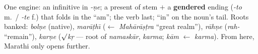 One engine: an infinitive in \emph{-\d{n}e}; a present of stem $+$ a
\textbf{gendered} ending (\emph{-to} m.\ / \emph{-te} f.) that folds in the
``am''; the verb last; ``in'' on the noun's tail. Roots banked: \emph{bol\d{n}e}
(native), \emph{mar\=a\d{t}h\=\i} ($\leftarrow$ \emph{Mah\=ar\=a\d{s}\d{t}ra}
``great realm''), \emph{r\=ah\d{n}e} (\emph{rah-} ``remain''), \emph{kar\d{n}e}
(\emph{$\surd$k\d{r}} --- root of \emph{namask\=ar}, \emph{karma}; \emph{k\=am}
$\leftarrow$ \emph{karma}). From here, Marathi only opens further.
